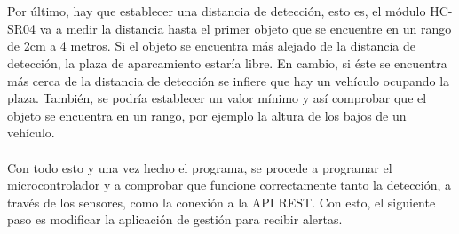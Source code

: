 \\\\
Por último, hay que establecer una distancia de detección, esto es, el módulo HC-SR04 va a medir la distancia hasta el primer objeto que se encuentre en un rango de 2cm a 4 metros. Si el objeto se encuentra más alejado de la distancia de detección, la plaza de aparcamiento estaría libre. En cambio, si éste se encuentra más cerca de la distancia de detección se infiere que hay un vehículo ocupando la plaza. También, se podría establecer un valor mínimo y así comprobar que el objeto se encuentra en un rango, por ejemplo la altura de los bajos de un vehículo.
\\\\
Con todo esto y una vez hecho el programa, se procede a programar el microcontrolador y a comprobar que funcione correctamente tanto la detección, a través de los sensores, como la conexión a la API REST. Con esto, el siguiente paso es modificar la aplicación de gestión para recibir alertas.

